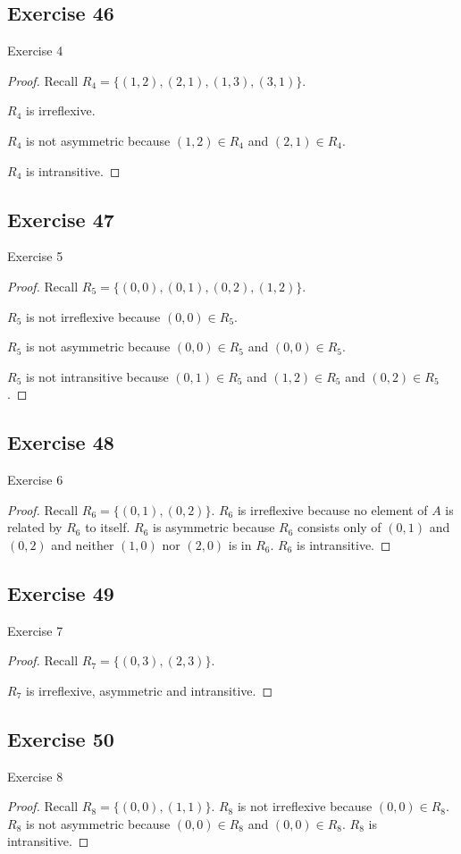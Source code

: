 \documentclass[14pt]{extarticle}
\begin{document}
\subsection{Exercise 46}
Exercise 4
\begin{proof}
        Recall \(R_4 = \{(1, 2), (2, 1), (1, 3), (3, 1)\}\).

        \(R_4\) is irreflexive.

        \(R_4\) is not asymmetric because \((1, 2) \in R_4\) and \((2, 1) \in R_4\).

        \(R_4\) is intransitive.
\end{proof}

\subsection{Exercise 47}
Exercise 5
\begin{proof}
        Recall \(R_5 = \{(0, 0), (0, 1), (0, 2), (1, 2)\}\).

        \(R_5\) is not irreflexive because \((0,0) \in R_5\).

        \(R_5\) is not asymmetric because \((0, 0) \in R_5\) and \((0, 0) \in R_5\).

        \(R_5\) is not intransitive because \((0,1) \in R_5\) and \((1,2) \in R_5\) and \((0,2) \in R_5\).
\end{proof}

\subsection{Exercise 48}
Exercise 6
\begin{proof}
        Recall \(R_6 = \{(0, 1), (0, 2)\}\). \(R_6\) is irreflexive because no element of \(A\) is related by \(R_6\) to
        itself. \(R_6\) is asymmetric because \(R_6\) consists only of \((0, 1)\) and \((0, 2)\) and neither \((1, 0)\) nor
        \((2, 0)\) is in \(R_6\). \(R_6\) is intransitive.
\end{proof}

\subsection{Exercise 49}
Exercise 7
\begin{proof}
        Recall \(R_7 = \{(0, 3), (2, 3)\}\).

        \(R_7\) is irreflexive, asymmetric and intransitive.
\end{proof}

\subsection{Exercise 50}
Exercise 8
\begin{proof}
        Recall \(R_8 = \{(0, 0), (1, 1)\}\). \(R_8\) is not irreflexive because \((0,0) \in R_8\). \(R_8\) is not
        asymmetric because \((0,0) \in R_8\) and \((0,0) \in R_8\).
        \(R_8\) is intransitive.
\end{proof}
\end{document}
